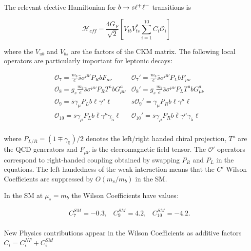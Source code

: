 The relevant efective Hamiltonian for $b\rightarrow s\ell^+\ell^-$ transitions is

\begin{equation}
\mathcal{H}_{eff} = \frac{4G_F}{\sqrt{2}} \left[ V_{tb}V^*_{ts} \sum_{i=1}^{10} C_i \mathcal{O}_i \right]
\end{equation}

where the $V_{ub}$ and $V_{bs}$ are the factors of the CKM matrix.
The following local operators are particularly important for leptonic decays:

\begin{align}
& \mathcal{O}_7 = \frac{m_b}{e} \bar{s} \sigma^{\mu\nu}P_RbF_{\mu\nu}  			& \mathcal{O}_7' = \frac{m_b}{e} \bar{s} \sigma^{\mu\nu}P_LbF_{\mu\nu} \\
& \mathcal{O}_8 = g_s\frac{m_b}{e} \bar{s} \sigma^{\mu\nu}P_RT^abG^a_{\mu\nu}  	& \mathcal{O}_8' = g_s\frac{m_b}{e} \bar{s} \sigma^{\mu\nu}P_LT^abG^a_{\mu\nu} \\
& \mathcal{O}_9 = \bar{s} \gamma_{\mu}P_Lb\bar{\ell}\gamma^\mu\ell  			& \bar{s} \mathcal{O}_9' = \gamma_{\mu}P_Rb\bar{\ell}\gamma^\mu\ell \\
& \mathcal{O}_{10} = \bar{s} \gamma_{\mu}P_Lb\bar{\ell}\gamma^\mu\gamma_5\ell 	& \mathcal{O}_{10}' = \bar{s} \gamma_{\mu}P_Rb\bar{\ell}\gamma^\mu\gamma_5\ell \\
\end{align}


where $P_{L/R} = (1 \mp \gamma_5)/2$ denotes the left/right handed chiral projection,
$T^a$ are the QCD generators and $F_{\mu\nu}$ is the elecromagnetic field tensor.
The $\mathcal{O}'$ operators correspond to right-handed coupling obtained by swapping $P_R$ and $P_L$ in the equations.
The left-handedness of the weak interaction means that the $C'$ Wilson Coefficients are suppressed by $O(m_s / m_b)$ in the SM.

In the SM at $\mu_s = m_b$ the Wilson Coefficients have values:

\begin{align}
& C_7^{SM} = -0.3, & C_9^{SM} = 4.2, & C_{10}^{SM} = -4.2. \\
\end{align}

New Physics contributions appear in the Wilson Coefficients as additive factors $C_i = C_i^{NP} + C_i^{SM}$

